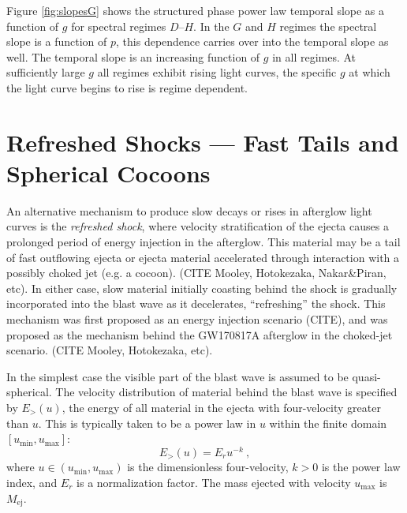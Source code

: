 \documentclass[twocolumn]{aastex62}
\newcommand{\gwbns}{GW170817A}
\newcommand{\Mej}{\ensuremath{M_{\mathrm{ej}}}}
\newcommand{\umin}{\ensuremath{u_{\mathrm{min}}}}
\newcommand{\umax}{\ensuremath{u_{\mathrm{max}}}}
\begin{document}
Figure \ref{fig:slopesG} shows the structured phase power law temporal slope as a function of $g$ for spectral regimes $D$--$H$. In the $G$ and $H$ regimes the spectral slope is a function of $p$, this dependence carries over into the temporal slope as well. The temporal slope is an increasing function of $g$ in all regimes.  At sufficiently large $g$ all regimes exhibit rising light curves, the specific $g$ at which the light curve begins to rise is regime dependent.

\section{Refreshed Shocks --- Fast Tails and Spherical Cocoons}\label{sec:refreshedShocks}

An alternative mechanism to produce slow decays or rises in afterglow light curves is the \emph{refreshed shock}, where velocity stratification of the ejecta causes a prolonged period of energy injection in the afterglow.  This material may be a tail of fast outflowing ejecta or ejecta material accelerated through interaction with a possibly choked jet (e.g. a cocoon). (CITE Mooley, Hotokezaka, Nakar\&Piran, etc).  In either case, slow material initially coasting behind the shock is gradually incorporated into the blast wave as it decelerates, ``refreshing'' the shock.  This mechanism was first proposed as an energy injection scenario (CITE), and was proposed as the mechanism behind the \gwbns{} afterglow in the choked-jet scenario. (CITE Mooley, Hotokezaka, etc).

In the simplest case the visible part of the blast wave is assumed to be quasi-spherical.  The velocity distribution of material behind the blast wave is specified by $E_{>}(u)$, the energy of all material in the ejecta with four-velocity greater than $u$.  This is typically taken to be a power law in $u$ within the finite domain $[\umin, \umax]$:
\begin{equation}
	E_>(u) = E_r u^{-k}\ , \label{eq:Eu}
\end{equation}
where $u \in (\umin, \umax)$ is the dimensionless four-velocity, $k>0$ is the power law index, and $E_r$ is a normalization factor.  The mass ejected with velocity $\umax$ is $\Mej$.

%
%
\end{document}
